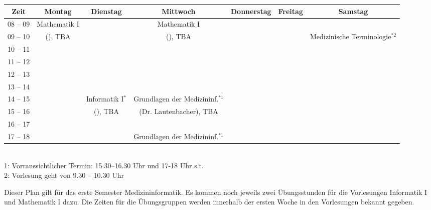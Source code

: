 \begin{minipage}{\textwidth}
    \footnotesize
\begin{center}
	\begin{tabular}{|c|c|c|c|c|c|c|}
	\hline
	 Zeit     &    Montag                    & Dienstag          & Mittwoch               	  	& Donnerstag & Freitag 	& Samstag\\ \hline\hline
	 08 -- 09 &    Mathematik I              &                   & Mathematik I      	  	&  &  			&\\ \cline{1-1} \cline{3-3} \cline{5-7} 
	 09 -- 10 &    (\Matheprof), TBA         &                   & (\Matheprof), TBA 	  	&  &  		       	& Medizinische Terminologie$^{*2}$\\ \hline
	 10 -- 11 &                              &                   &                   	  	&  &  			&\\ \cline{1-1} \cline{3-7} 
	 11 -- 12 &                              &                   &                   	  	&  &  			&\\ \hline
	 12 -- 13 &                              &                   &                   	  	&  &  			&\\ \hline
	 13 -- 14 &                              &                   &                   	  	&  &  			&\\ \hline
	 14 -- 15 &                              & Informatik I$^*$  & Grundlagen der Medizininf.$^{*1}$&  &  			&\\ \cline{1-2} \cline{4-7} 
	 15 -- 16 &                              & (\Infoprof), TBA  & (Dr. Lautenbacher), TBA    	&  &  			&\\ \cline{1-3} \cline{5-7}
	 16 -- 17 &                              &                   &                   	  	&  &  			&\\ \hline
	 17 -- 18 &                              &                   & Grundlagen der Medizininf.$^{*1}$&  &  			&\\ \hline
	\end{tabular}
    ~\\
\scriptsize %
1: Vorraussichtlicher Termin: 15.30--16.30 Uhr und 17-18 Uhr s.t.\\
2: Vorlesung geht von 9.30 -- 10.30 Uhr
\end{center}
\end{minipage}
Dieser Plan gilt für das erste Semester Medizininformatik. Es kommen noch jeweils zwei Übungsstunden für die Vorlesungen 
Informatik I und Mathematik I dazu. Die Zeiten für die Übungsgruppen werden innerhalb der ersten Woche in den Vorlesungen bekannt gegeben.
